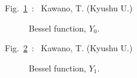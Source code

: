 \documentclass[12pt]{article}
\begin{document}
%
%
\begin{flushright} Fig.~\ref{besy0}~:~ Kawano, T. (Kyushu U.) \end{flushright}
\begin{figure}[b!]
  \begin{center}
    \caption{Bessel function, $Y_0$.}
    \label{besy0}
  \end{center}
\end{figure}
\clearpage

%
%
\begin{flushright} Fig.~\ref{besy1}~:~ Kawano, T. (Kyushu U.) \end{flushright}
\begin{figure}[b!]
  \begin{center}
    \caption{Bessel function, $Y_1$.}
    \label{besy1}
  \end{center}
\end{figure}
\clearpage
\end{document}
